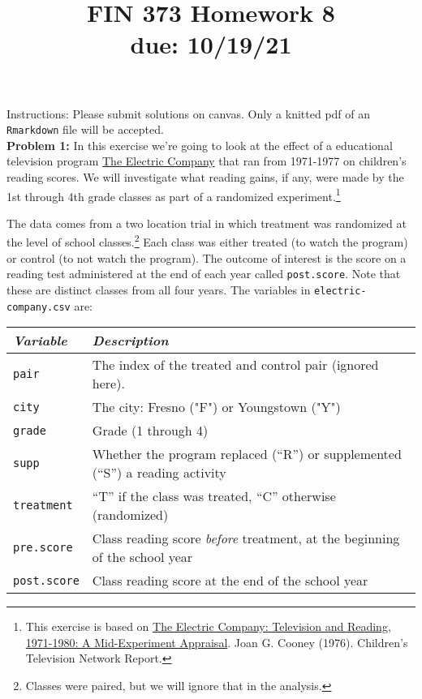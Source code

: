 \documentclass[11pt]{article}
\begin{document}
\title{FIN 373 Homework 8 \\ {\large due: \textbf{10/19/21}}}
\date{}
\maketitle

\vspace{-20mm}

\noindent Instructions: Please submit solutions on canvas.  Only a knitted pdf of an {\tt Rmarkdown} file will be accepted.
\\

\noindent \textbf{Problem 1:} In this exercise we're going to look at the effect 
of a educational television program 
\href{https://en.wikipedia.org/wiki/The_Electric_Company}{The Electric Company}
that ran from 1971-1977 on children's reading scores.  We will investigate what reading gains, if any, were made by the 1st through 4th grade classes as part of a randomized experiment.\footnote{This exercise is based on \href{https://files.eric.ed.gov/fulltext/ED130635.pdf}{The Electric Company: Television and Reading, 1971-1980: A Mid-Experiment Appraisal}. Joan G. Cooney (1976). Children's Television Network Report.}

The data comes from a two location trial in which 
treatment was randomized at the level of school classes.\footnote{Classes were 
paired, but we will ignore that in the analysis.} Each class was 
either treated (to watch the program) or control (to not watch the 
program). The outcome of interest is the score on a reading test 
administered at the end of each year called {\tt post.score}. Note that 
these are distinct classes from all four years.  The variables in {\tt electric-company.csv} are:



\vspace{3mm}
\begin{center}
\begin{tabular}{l p{}}
 \hline
\textit{Variable} & \textit{Description} \\
\hline
{\tt pair} &               The index of the treated and control pair (ignored
                      here). \\
{\tt city} &               The city: Fresno ("F") or Youngstown ("Y") \\
{\tt grade} &              Grade (1 through 4) \\
{\tt supp} &               Whether the program replaced (``R'') or supplemented 
                      (``S'') a reading activity \\
{\tt treatment} &          ``T'' if the class was treated, ``C'' otherwise (randomized) \\
{\tt pre.score} &          Class reading score \textit{before} treatment, at the 
                      beginning of the school year \\
{\tt post.score} &        Class reading score at the end of the school year \\
\hline
\end{tabular}
\end{center}    
\end{document}
